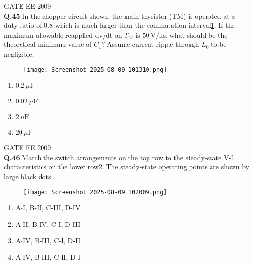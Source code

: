 \documentclass[12pt]{article}
\begin{document}
\vspace{1cm}

\hspace{10pt}
GATE EE 2009\\


\noindent\textbf{Q.45} In the chopper circuit shown, the main thyristor (TM) is operated at a duty ratio of 0.8 which is much larger than the commutation interval\ref{fig:13}.
If the maximum allowable reapplied dv/dt on \(T_M\) is \(50~\mathrm{V/\mu s}\), what should be the theoretical minimum value of \(C_1\)?
Assume current ripple through \(L_0\) to be negligible.
\begin{figure}[h]
    \centering
    \texttt{[image: Screenshot 2025-08-09 101310.png]}
    \label{fig:13}
\end{figure}

\begin{enumerate}
    \item  $0.2~\mu\mathrm{F}$
\item  $0.02~\mu\mathrm{F}$  
\item  $2~\mu\mathrm{F}$ 
\item  $20~\mu\mathrm{F}$ 
\end{enumerate}





\vspace{0.5cm}
\hspace{10pt}
GATE EE 2009\\
\noindent\textbf{Q.46} Match the switch arrangements on the top row to the steady-state V-I characteristics on the lower row\ref{fig:14}.
The steady-state operating points are shown by large black dots.

\vspace{0.2cm}

\begin{figure}[h]
    \centering
    \texttt{[image: Screenshot 2025-08-09 102009.png]}
    \label{fig:14}
\end{figure}

\vspace{0.3cm}


\begin{enumerate}
     \item  A-I, B-II, C-III, D-IV
    \item  A-II, B-IV, C-I, D-III
    \item  A-IV, B-III, C-I, D-II
    \item  A-IV, B-III, C-II, D-I
\end{enumerate}
\end{document}
